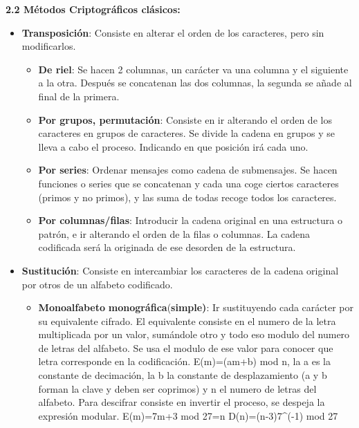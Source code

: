 \documentclass[12pt, twoside, openright]{report} %
\begin{document}
  \pagebreak
  \textbf{2.2 Métodos Criptográficos clásicos:}
  

  \begin{itemize}
  \item \textbf{Transposición}: Consiste en alterar el orden de los
    caracteres, pero sin modificarlos.
    

    \begin{itemize}
    \item \textbf{De riel}: Se hacen 2 columnas, un carácter va una columna
      y el siguiente a la otra. Después se concatenan las dos columnas,
      la segunda se añade al final de la primera.
      
    \item \textbf{Por grupos, permutación}: Consiste en ir alterando el
      orden de los caracteres en grupos de caracteres. Se divide la
      cadena en grupos y se lleva a cabo el proceso. Indicando en que
      posición irá cada uno.
      
    \item \textbf{Por series}: Ordenar mensajes como cadena de submensajes.
      Se hacen funciones o series que se concatenan y cada una coge
      ciertos caracteres (primos y no primos), y las suma de todas
      recoge todos los caracteres.
      
    \item \textbf{Por columnas/filas}: Introducir la cadena original en una
      estructura o patrón, e ir alterando el orden de la filas o
      columnas. La cadena codificada será la originada de ese desorden
      de la estructura.
      
    \end{itemize}
  \item \textbf{Sustitución}: Consiste en intercambiar los caracteres de la
    cadena original por otros de un alfabeto codificado.
    

    \begin{itemize}
    \item \textbf{Monoalfabeto} \textbf{monográfica}(\textbf{simple)}: Ir
      sustituyendo cada carácter por su equivalente cifrado. El
      equivalente consiste en el numero de la letra multiplicada por un
      valor, sumándole otro y todo eso modulo del numero de letras del
      alfabeto. Se usa el modulo de ese valor para conocer que letra
      corresponde en la codificación. E(m)=(am+b) mod n, la a es la
      constante de decimación, la b la constante de desplazamiento (a y
      b forman la clave y deben ser coprimos) y n el numero de letras
      del alfabeto. Para descifrar consiste en invertir el proceso, se
      despeja la expresión modular. E(m)=7m+3 mod 27=n
      D(n)=(n-3)7\^{}(-1) mod 27
      


\end{itemize}
\end{itemize}
\end{document}
